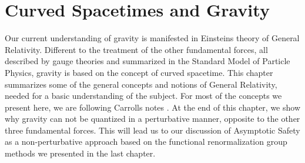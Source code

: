 \chapter{Curved Spacetimes and Gravity}\label{chap:GR}
Our current understanding of gravity is manifested in Einsteins theory of General Relativity. Different to the treatment of the other fundamental forces, all described by gauge theories and summarized in the Standard Model of Particle Physics, gravity is based on the concept of curved spacetime. This chapter summarizes some of the general concepts and notions of General Relativity, needed for a basic understanding of the subject. For most of the concepts we present here, we are following Carrolls notes \cite{CarrollGR}. At the end of this chapter, we show why gravity can not be quantized in a perturbative manner, opposite to the other three fundamental forces. This will lead us to our discussion of Asymptotic Safety as a non-perturbative approach based on the functional renormalization group methods we presented in the last chapter.  

